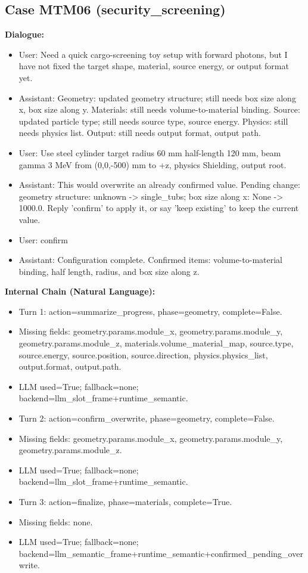 \documentclass[11pt]{ctexart}
\begin{document}
\subsection{Case MTM06 (security\_screening)}
\textbf{Dialogue:}
\begin{itemize}
\item User: Need a quick cargo-screening toy setup with forward photons, but I have not fixed the target shape, material, source energy, or output format yet.
\item Assistant: Geometry: updated geometry structure; still needs box size along x, box size along y. Materials: still needs volume-to-material binding. Source: updated particle type; still needs source type, source energy. Physics: still needs physics list. Output: still needs output format, output path.
\item User: Use steel cylinder target radius 60 mm half-length 120 mm, beam gamma 3 MeV from (0,0,-500) mm to +z, physics Shielding, output root.
\item Assistant: This would overwrite an already confirmed value. Pending change: geometry structure: unknown -> single\_tubs; box size along x: None -> 1000.0. Reply 'confirm' to apply it, or say 'keep existing' to keep the current value.
\item User: confirm
\item Assistant: Configuration complete. Confirmed items: volume-to-material binding, half length, radius, and box size along z.
\end{itemize}
\textbf{Internal Chain (Natural Language):}
\begin{itemize}
\item Turn 1: action=summarize\_progress, phase=geometry, complete=False.
\item Missing fields: geometry.params.module\_x, geometry.params.module\_y, geometry.params.module\_z, materials.volume\_material\_map, source.type, source.energy, source.position, source.direction, physics.physics\_list, output.format, output.path.
\item LLM used=True; fallback=none; backend=llm\_slot\_frame+runtime\_semantic.
\item Turn 2: action=confirm\_overwrite, phase=geometry, complete=False.
\item Missing fields: geometry.params.module\_x, geometry.params.module\_y, geometry.params.module\_z.
\item LLM used=True; fallback=none; backend=llm\_slot\_frame+runtime\_semantic.
\item Turn 3: action=finalize, phase=materials, complete=True.
\item Missing fields: none.
\item LLM used=True; fallback=none; backend=llm\_semantic\_frame+runtime\_semantic+confirmed\_pending\_overwrite.
\end{itemize}
\end{document}
